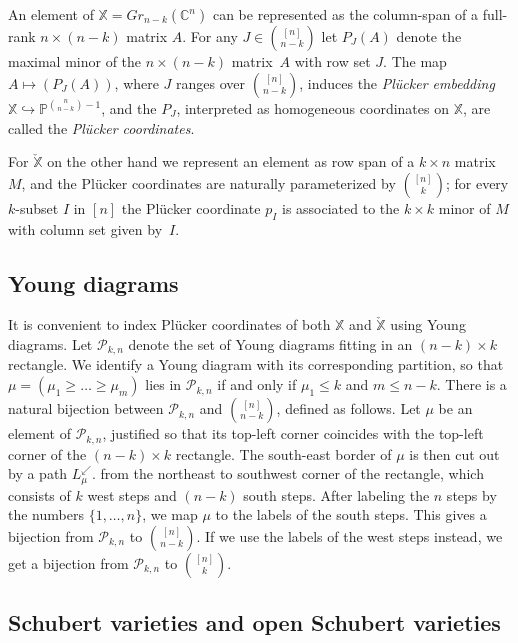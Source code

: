 \documentclass{amsart}
\theoremstyle{definition}
\numberwithin{equation}{section}
\newcommand{\pathsw}[1]{L^\swarrow_{#1}}
\newcommand{\Shkn}{{\mathcal P_{k,n}}}
\newcommand{\C}{\mathbb{C}}
\newcommand{\mathbbX}{\mathbb X}
\newcommand{\checkX}{\check{X}}
\newcommand{\X}{\mathbb X}
\begin{document}
An element of $\mathbb X=Gr_{n-k}(\C^n)$
can be represented as the column-span of a full-rank $n\times (n-k)$ matrix $A$.
For any $J\in \binom{[n]}{n-k}$ let $P_J(A)$
denote the maximal minor of the $n\times (n-k)$ matrix~$A$ with row set $J$.
The map $A\mapsto (P_J(A))$, where $J$ ranges over $\binom{[n]}{n-k}$,
induces the {\it Pl\"ucker embedding\/} $\mathbbX\hookrightarrow \mathbb{P}^{\binom{n}{n-k}-1}$, and the $P_J$, interpreted as homogeneous coordinates on $\X$, are called the \emph{Pl\"ucker coordinates}.


For $\mathbb\checkX$ on the other hand we represent an element as row span of a $k\times n$ matrix $M$, and the Pl\"ucker coordinates  are naturally parameterized by $\binom{[n]}{k}$; for every $k$-subset $I$ in $[n]$ the Pl\"ucker coordinate $p_I$ is associated to the $k\times k$ minor of $M$ with column set given by~$I$.







\color{black}
\subsection{Young diagrams}\label{s:Young}
 It is convenient to index Pl\"ucker coordinates of both 
$\mathbbX$ and $\mathbb\checkX$ using Young diagrams. 
Let $\Shkn$ denote the set of Young diagrams fitting in an 
$(n-k)\times k $ rectangle. We identify a Young diagram with its corresponding partition, so that $\mu=(\mu_1\ge \dotsc\ge\mu_m)$ lies in $\Shkn$ if and only if $\mu_1\le k$ and $m\le n-k$.  There is a natural bijection between 
$\Shkn$ and 
${[n] \choose n-k}$, defined as follows.  Let $\mu$ be an element of 
$\Shkn$, justified so that its top-left corner coincides with 
the top-left corner of the 
$(n-k) \times k$ rectangle.  The south-east border of $\mu$ is then
cut out by a path 
 $\pathsw{\mu}$.
from the 
northeast to southwest corner of the rectangle, which consists of $k$
west steps and $(n-k)$ south steps.  After labeling the $n$ steps by 
the numbers $\{1,\dots,n\}$, we map $\mu$ to the labels of the 
south steps.  This gives a bijection 
from $\Shkn$ to
${[n] \choose n-k}$.  If we use the labels of the west steps instead,
we get a bijection
from $\Shkn$ to
${[n] \choose k}$.

\subsection{Schubert varieties and open Schubert varieties}\label{s:SchubandOpenSchub}
\end{document}
